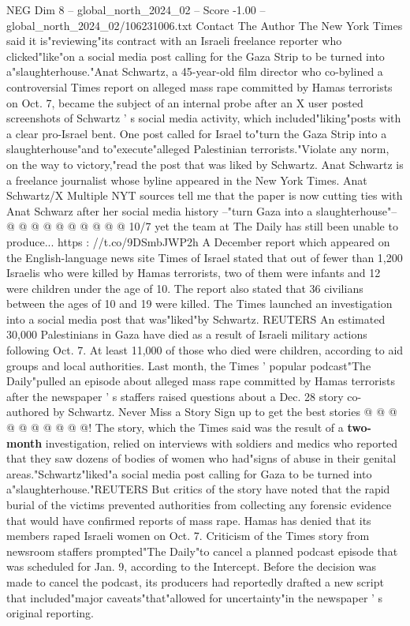 \begin{textsample}{NEG Dim 8 – global\_north\_2024\_02 – Score -1.00 – global\_north\_2024\_02/106231006.txt}  \label{ex:f8_neg_430}
Contact The Author The New York Times said it is"reviewing"its contract with an Israeli freelance reporter who clicked"like"on a social media post calling for the Gaza Strip to be turned into a"slaughterhouse."Anat Schwartz, a 45-year-old film director who co-bylined a controversial Times report on alleged mass rape committed by Hamas terrorists on Oct. 7, became the subject of an internal probe after an X user posted screenshots of Schwartz ' s social media activity, which included"liking"posts with a clear pro-Israel bent.
One post called for Israel to"turn the Gaza Strip into a slaughterhouse"and to"execute"alleged Palestinian terrorists."Violate any norm, on the way to victory,"read the post that was liked by Schwartz.
Anat Schwartz is a freelance journalist whose byline appeared in the New York Times.
Anat Schwartz/X Multiple NYT sources tell me that the paper is now cutting ties with Anat Schwarz after her social media history --"turn Gaza into a slaughterhouse"-- @ @ @ @ @ @ @ @ @ @ 10/7 yet the team at The Daily has still been unable to produce... https : //t.co/9DSmbJWP2h A December report which appeared on the English-language news site Times of Israel stated that out of fewer than 1,200 Israelis who were killed by Hamas terrorists, two of them were infants and 12 were children under the age of 10.
The report also stated that 36 civilians between the ages of 10 and 19 were killed.
The Times launched an investigation into a social media post that was"liked"by Schwartz.
REUTERS An estimated 30,000 Palestinians in Gaza have died as a result of Israeli military actions following Oct. 7.
At least 11,000 of those who died were children, according to aid groups and local authorities.
Last month, the Times ' popular podcast"The Daily"pulled an episode about alleged mass rape committed by Hamas terrorists after the newspaper ' s staffers raised questions about a Dec. 28 story co-authored by Schwartz.
Never Miss a Story Sign up to get the best stories @ @ @ @ @ @ @ @ @ @!
The story, which the Times said was the result of a \textbf{two-month} investigation, relied on interviews with soldiers and medics who reported that they saw dozens of bodies of women who had"signs of abuse in their genital areas."Schwartz"liked"a social media post calling for Gaza to be turned into a"slaughterhouse."REUTERS But critics of the story have noted that the rapid burial of the victims prevented authorities from collecting any forensic evidence that would have confirmed reports of mass rape.
Hamas has denied that its members raped Israeli women on Oct. 7.
Criticism of the Times story from newsroom staffers prompted"The Daily"to cancel a planned podcast episode that was scheduled for Jan. 9, according to the Intercept.
Before the decision was made to cancel the podcast, its producers had reportedly drafted a new script that included"major caveats"that"allowed for uncertainty"in the newspaper ' s original reporting.

\end{textsample}
